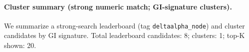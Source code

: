 \paragraph{Cluster summary (strong numeric match; GI-signature clusters).} \AuditTag We summarize a strong-search leaderboard (tag \texttt{deltaalpha\_node}) and cluster candidates by GI signature. Total leaderboard candidates: 8; clusters: 1; top-K shown: 20.